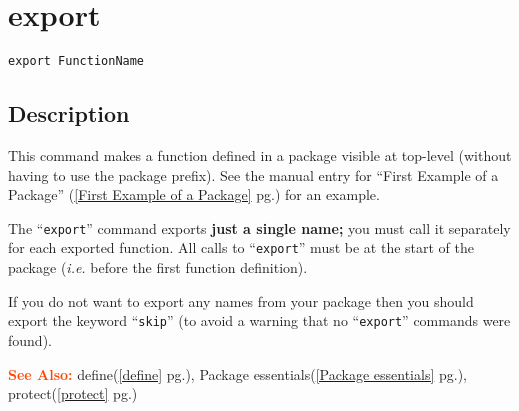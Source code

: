\documentclass[a4paper]{mybook}
\newenvironment{command}{}{} %
\newcommand\SeeAlso{\par\textcolor{OrangeRed}{\textbf{\large See Also: }}}
\begin{document}
\section{export}
\label{export}
\begin{command} %


\begin{Verbatim}[label=syntax, rulecolor=\color{MidnightBlue},
frame=single]
export FunctionName
\end{Verbatim}


\subsection*{Description}

This command makes a function defined in a package visible at top-level
(without having to use the package prefix).  See the manual entry for
``First Example of a Package'' (\ref{First Example of a Package} pg.\pageref{First Example of a Package}) for an example.
\par 
The ``\verb&export&'' command exports \textbf{just a single name;} you must call
it separately for each exported function.  All calls to ``\verb&export&''
must be at the start of the package (\textit{i.e.} before the first function
definition).
\par 
If you do not want to export any names from your package then you
should export the keyword ``\verb&skip&'' (to avoid a warning that no ``\verb&export&''
commands were found).

\SeeAlso %
  define(\ref{define} pg.\pageref{define}), 
    Package essentials(\ref{Package essentials} pg.\pageref{Package essentials}), 
    protect(\ref{protect} pg.\pageref{protect})
\end{command} %
\end{document}
